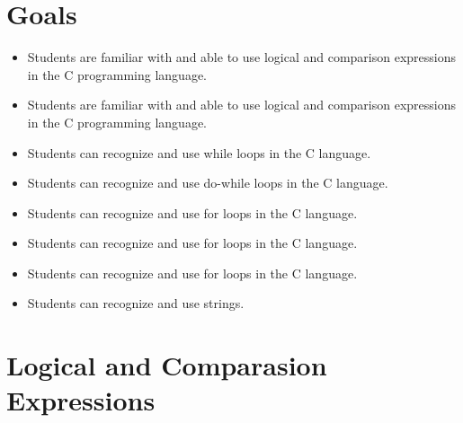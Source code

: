\section{Goals}
\begin{itemize}[label=$\bullet$, itemsep=-1pt, leftmargin=*]
	\item Students are familiar with and able to use logical and comparison expressions in the C programming language.
	\item Students are familiar with and able to use logical and comparison expressions in the C programming language.
	\item Students can recognize and use while loops in the C language.
	\item Students can recognize and use do-while loops in the C language.
	\item Students can recognize and use for loops in the C language.
	\item Students can recognize and use for loops in the C language.
	\item Students can recognize and use for loops in the C language.
	\item Students can recognize and use strings.
\end{itemize}
\section{Logical and Comparasion Expressions}
